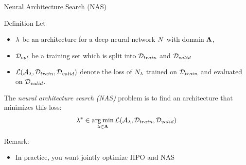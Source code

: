 \begin{frame}[c]{Neural Architecture Search (NAS)}

\begin{block}{Definition}
	Let 
	\begin{itemize}
		\item $\mathbf{\lambda}$ be \alert{an architecture for a deep neural network $N$} with domain $\mathbf{\Lambda}$,
		\item $\mathcal{D}_{opt}$ be a training set which is split into $\mathcal{D}_{train}$ and $\mathcal{D}_{valid}$ 
		\item $\mathcal{L}(\mathcal{A}_{\mathbf{\lambda}}, \mathcal{D}_{train}, \mathcal{D}_{valid})$ denote the loss of $N_{\mathbf{\lambda}}$ trained on $\mathcal{D}_{train}$ and evaluated on $\mathcal{D}_{valid}$.
	\end{itemize}
	The \emph{neural architecture search (NAS)} problem is to find an architecture that minimizes this loss:
	\begin{equation}
	\mathbf{\lambda}^* \in \operatorname*{arg\,min}_{\mathbf{\lambda} \in \mathbf{\Lambda}} \mathcal{L}(\mathcal{A}_{\mathbf{\lambda}}, \mathcal{D}_{train}, \mathcal{D}_{valid}) \nonumber  
	\end{equation}
\end{block}

\pause
\smallskip
Remark:
\begin{itemize}
	\item In practice, you want jointly optimize HPO and NAS~
\end{itemize}

\end{frame}
